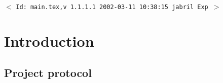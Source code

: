 \documentclass[11pt]{report}
\newcommand{\sctn}[1]{\section{#1}}
\newcommand{\subsctn}[1]{\subsection{#1}}
\begin{document}


%

\newpage %
\setcounter{page}{1}
\pagestyle{fancy}
\renewcommand{\sectionmark}[1]{\markboth{}{\thesection.\ #1}}
\renewcommand{\subsectionmark}[1]{\markboth{}{\thesubsection.\ \textsl{#1}}}

\tableofcontents
\listoftables
\listoffigures

\vfill
\begin{center}
{\small$<$ \verb$Id: main.tex,v 1.1.1.1 2002-03-11 10:38:15 jabril Exp $$>$ }
\end{center}


\newpage %

\setcounter{page}{1}

\sctn{Introduction}

\subsctn{Project protocol}

%
\end{document}
